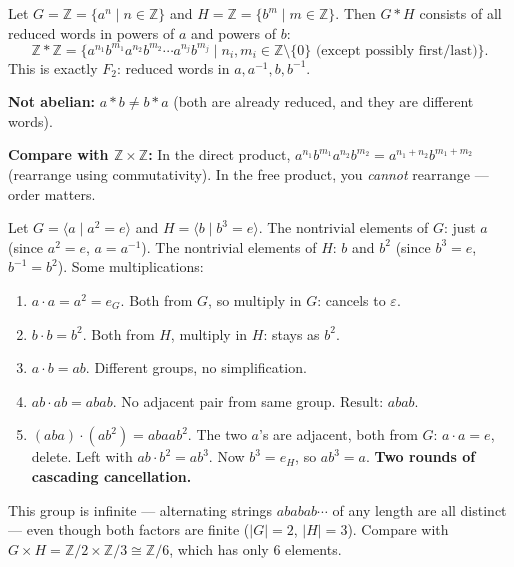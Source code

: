 \documentclass[11pt]{report}
\begin{document}
\begin{exbox}
Let $G = \mathbb{Z} = \{a^n \mid n \in \mathbb{Z}\}$ and $H = \mathbb{Z} = \{b^m \mid m \in \mathbb{Z}\}$. Then $G * H$ consists of all reduced words in powers of $a$ and powers of $b$:
\[\mathbb{Z} * \mathbb{Z} = \{a^{n_1} b^{m_1} a^{n_2} b^{m_2} \cdots a^{n_j} b^{m_j} \mid n_i, m_i \in \mathbb{Z} \setminus \{0\} \text{ (except possibly first/last)}\}.\]
This is exactly $F_2$: reduced words in $a, a^{-1}, b, b^{-1}$.

\textbf{Not abelian:} $a * b \neq b * a$ (both are already reduced, and they are different words).

\textbf{Compare with $\mathbb{Z} \times \mathbb{Z}$:} In the direct product, $a^{n_1}b^{m_1}a^{n_2}b^{m_2} = a^{n_1+n_2}b^{m_1+m_2}$ (rearrange using commutativity). In the free product, you \emph{cannot} rearrange --- order matters.
\end{exbox}

\begin{exbox}
Let $G = \langle a \mid a^2 = e \rangle$ and $H = \langle b \mid b^3 = e \rangle$. The nontrivial elements of $G$: just $a$ (since $a^2 = e$, $a = a^{-1}$). The nontrivial elements of $H$: $b$ and $b^2$ (since $b^3 = e$, $b^{-1} = b^2$). Some multiplications:
\begin{enumerate}[nosep]
    \item $a \cdot a = a^2 = e_G$. Both from $G$, so multiply in $G$: cancels to $\varepsilon$.
    \item $b \cdot b = b^2$. Both from $H$, multiply in $H$: stays as $b^2$.
    \item $a \cdot b = ab$. Different groups, no simplification.
    \item $ab \cdot ab = abab$. No adjacent pair from same group. Result: $abab$.
    \item $(aba) \cdot (ab^2) = abaab^2$. The two $a$'s are adjacent, both from $G$: $a \cdot a = e$, delete. Left with $ab \cdot b^2 = ab^3$. Now $b^3 = e_H$, so $ab^3 = a$. \textbf{Two rounds of cascading cancellation.}
\end{enumerate}
This group is infinite --- alternating strings $ababab\cdots$ of any length are all distinct --- even though both factors are finite ($|G| = 2$, $|H| = 3$). Compare with $G \times H = \mathbb{Z}/2 \times \mathbb{Z}/3 \cong \mathbb{Z}/6$, which has only $6$ elements.
\end{exbox}
\end{document}
